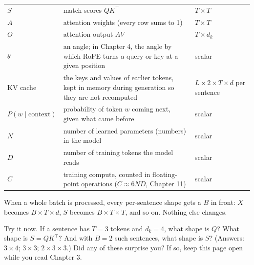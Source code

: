 \begin{center}
\begin{longtable}{@{}l P{8.6cm} l@{}}
$S$ & match scores $QK^\top$ & $T\times T$\\
$A$ & attention weights (every row sums to 1) & $T\times T$\\
$O$ & attention output $AV$ & $T\times d_k$\\
$\theta$ & an angle; in Chapter 4, the angle by which RoPE turns a query or key at a given position & scalar\\
KV cache & the keys and values of earlier tokens, kept in memory during generation so they are not recomputed & $L\times 2\times T\times d$ per sentence\\
$P(w\mid\text{context})$ & probability of token $w$ coming next, given what came before & scalar\\
$N$ & number of learned parameters (numbers) in the model & scalar\\
$D$ & number of training tokens the model reads & scalar\\
$C$ & training compute, counted in floating-point operations ($C\approx 6ND$, Chapter 11) & scalar\\
\bottomrule
\end{longtable}
\end{center}
When a whole batch is processed, every per-sentence shape gets a $B$ in front: $X$ becomes
$B\times T\times d$, $S$ becomes $B\times T\times T$, and so on. Nothing else changes.

Try it now. If a sentence has $T=3$ tokens and $d_k=4$, what shape is $Q$? What shape is $S=QK^\top$? And with
$B=2$ such sentences, what shape is $S$? (Answers: $3\times4$; $3\times3$; $2\times3\times3$.) Did any of
these surprise you? If so, keep this page open while you read Chapter 3.
